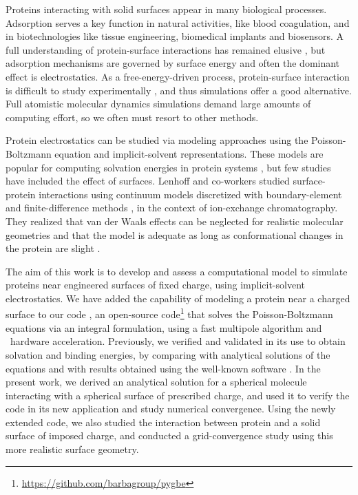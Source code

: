 
Proteins interacting with solid surfaces appear in many biological processes. Adsorption serves a key function in natural activities, like blood coagulation, and  in biotechnologies like tissue engineering, biomedical implants and biosensors.
A full understanding of protein-surface interactions has remained elusive \cite{Gray2004,RabeVerdesSeegel2011}, but adsorption mechanisms are governed by surface energy and often the dominant effect is electrostatics. As a free-energy-driven process, protein-surface interaction is difficult to study experimentally \cite{MijajlovicETal2013}, and thus simulations offer a good alternative. Full atomistic molecular dynamics simulations demand large amounts of computing effort, so we often must resort to other methods.

Protein electrostatics can be studied via modeling approaches using the Poisson-Boltzmann equation and implicit-solvent representations. These models  are popular for computing solvation energies in protein systems \cite{RouxSimonson1999,Bardhan2012}, but few studies have included the effect of surfaces. Lenhoff and co-workers studied surface-protein interactions using continuum models discretized with boundary-element \cite{YoonLenhoff1992,RothLenhoff1993,AsthagiriLenhoff1997} and finite-difference methods \cite{YaoLenhoff2004,YaoLenhoff2005}, in the context of ion-exchange chromatography. They realized that van der Waals effects can be neglected for realistic molecular geometries \cite{RothNealLenhoff1996} and that the model is adequate as long as conformational changes in the protein are slight \cite{YaoLenhoff2004,YaoLenhoff2005}. 

The aim of this work is to develop and assess a computational model to simulate proteins near engineered surfaces of fixed charge, using implicit-solvent electrostatics.
We have added the capability of modeling a protein near a charged surface to our code \pygbe, an open-source code\footnote{\url{https://github.com/barbagroup/pygbe}}  that solves the Poisson-Boltzmann equations via an integral formulation, using a fast multipole algorithm and \gpu\ hardware acceleration.  Previously, we verified and validated \pygbe in its use to obtain solvation and binding energies, by comparing with analytical solutions of the equations and with results obtained using the well-known \apbs software \cite{CooperBarba-share154331,CooperBardhanBarba2013}. 
In the present work, we derived an analytical solution for a spherical molecule interacting with a spherical surface of prescribed charge, and used it to verify the code in its new application and study numerical convergence.
Using the newly extended code, we also studied the interaction between protein \gb and a solid surface of imposed charge, 
and conducted a grid-convergence study using this more realistic surface geometry.

